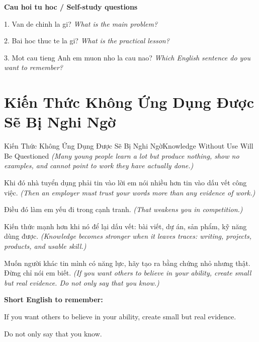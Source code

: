 \begin{tuhocnhanh}
\textbf{Cau hoi tu hoc / Self-study questions}

1. Van de chinh la gi? \textit{What is the main problem?}

2. Bai hoc thuc te la gi? \textit{What is the practical lesson?}

3. Mot cau tieng Anh em muon nho la cau nao? \textit{Which English sentence do you want to remember?}
\end{tuhocnhanh}
\ngancach

\section{Kiến Thức Không Ứng Dụng Được Sẽ Bị Nghi Ngờ}
\begin{truyen}{Kiến Thức Không Ứng Dụng Được Sẽ Bị Nghi Ngờ}{Knowledge Without Use Will Be Questioned}
\textit{(Many young people learn a lot but produce nothing, show no examples, and cannot point to work they have actually done.)}

Khi đó nhà tuyển dụng phải tin vào lời em nói nhiều hơn tin vào dấu vết công việc.
\textit{(Then an employer must trust your words more than any evidence of work.)}

Điều đó làm em yếu đi trong cạnh tranh.
\textit{(That weakens you in competition.)}

Kiến thức mạnh hơn khi nó để lại dấu vết: bài viết, dự án, sản phẩm, kỹ năng dùng được.
\textit{(Knowledge becomes stronger when it leaves traces: writing, projects, products, and usable skill.)}

\end{truyen}

\begin{baihoc}
Muốn người khác tin mình có năng lực, hãy tạo ra bằng chứng nhỏ nhưng thật. Đừng chỉ nói em biết.
\textit{(If you want others to believe in your ability, create small but real evidence. Do not only say that you know.)}
\end{baihoc}

\begin{ghinhoanh}
\textbf{Short English to remember:}

If you want others to believe in your ability, create small but real evidence.

Do not only say that you know.

\end{ghinhoanh}

